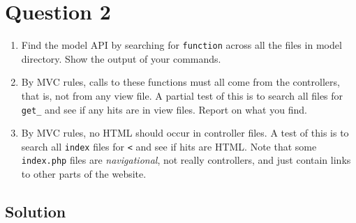 
\section*{Question 2}

\begin{enumerate}[label=(\alph*)]
\item Find the model API by searching for \texttt{function} across all the files in model directory. Show the output of your commands.

\item By MVC rules, calls to these functions must all come from the controllers, that is, not from any view file. A partial test of this is to search all files for \texttt{get\_} and see if any hits are in view files. Report on what you find.

\item By MVC rules, no HTML should occur in controller files. A test of this is to search all \texttt{index} files for \texttt{<} and see if hits are HTML. Note that some \texttt{index.php} files are \textit{navigational}, not really controllers, and just contain links to other parts of the website.
\end{enumerate}

\subsection*{Solution}


